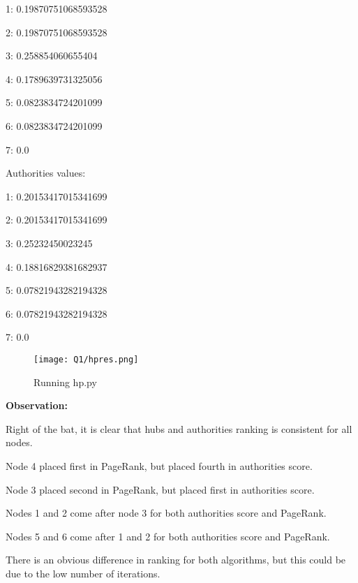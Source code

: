 1: 0.19870751068593528

2: 0.19870751068593528

3: 0.258854060655404

4: 0.1789639731325056

5: 0.0823834724201099

6: 0.0823834724201099 

7: 0.0


Authorities values:

1: 0.20153417015341699

2: 0.20153417015341699

3: 0.25232450023245

4: 0.18816829381682937

5: 0.07821943282194328

6: 0.07821943282194328

7: 0.0


\begin{figure}[h]
\caption{Running hp.py}
\centering
\texttt{[image: Q1/hpres.png]}
\end{figure}

\textbf{Observation:}

Right of the bat, it is clear that hubs and authorities ranking is consistent for all nodes. 

Node 4 placed first in PageRank, but placed fourth in authorities score.

Node 3 placed second in PageRank, but placed first  in authorities score.

Nodes 1 and 2 come after node 3 for both authorities score and PageRank.

Nodes 5 and 6 come after 1 and 2 for both authorities score and PageRank.

There is an obvious difference in ranking for both algorithms, but this could be due to the low number of iterations.


